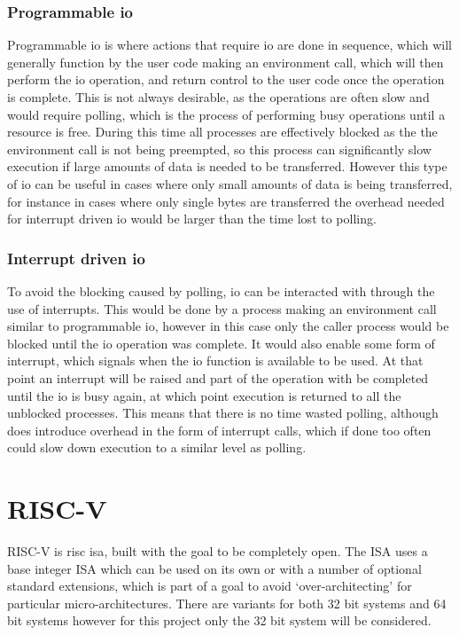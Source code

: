 \subsubsection{Programmable \ac{io}}
Programmable \ac{io} is where actions that require \ac{io} are done in sequence, which will generally function by the user code making an environment call, which will then perform the \ac{io} operation, and return control to the user code once the operation is complete. This is not always desirable, as the operations are often slow and would require polling, which is the process of performing busy operations until a resource is free. During this time all processes are effectively blocked as the the environment call is not being preempted, so this process can significantly slow execution if large amounts of data is needed to be transferred. However this type of \ac{io} can be useful in cases where only small amounts of data is being transferred, for instance in cases where only single bytes are transferred the overhead needed for interrupt driven \ac{io} would be larger than the time lost to polling.
\subsubsection{Interrupt driven \ac{io}}
To avoid the blocking caused by polling, \ac{io} can be interacted with through the use of interrupts. This would be done by a process making an environment call similar to programmable \ac{io}, however in this case only the caller process would be blocked until the \ac{io} operation was complete. It would also enable some form of interrupt, which signals when the \ac{io} function is available to be used. At that point an interrupt will be raised and part of the operation with be completed until the \ac{io} is busy again, at which point execution is returned to all the unblocked processes. This means that there is no time wasted polling, although does introduce overhead in the form of interrupt calls, which if done too often could slow down execution to a similar level as polling.
\section{RISC-V}
RISC-V is \ac{risc} \ac{isa}, built with the goal to be completely open. The ISA uses a base integer ISA which can be used on its own or with a number of optional standard extensions, which is part of a goal to avoid `over-architecting' for particular micro-architectures. There are variants for both 32 bit systems and 64 bit systems however for this project only the 32 bit system will be considered.\cite{riscv_unpriv}
